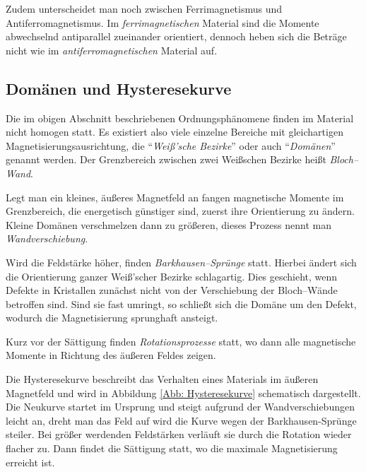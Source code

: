 \documentclass[12pt,a4paper]{scrartcl}
\numberwithin{equation}{section} %
\begin{document}
Zudem unterscheidet man noch zwischen Ferrimagnetismus und Antiferromagnetismus. Im \emph{ferrimagnetischen} Material sind die Momente abwechselnd antiparallel zueinander orientiert, dennoch heben sich die Beträge nicht wie im \emph{antiferromagnetischen} Material auf.

\hypertarget{domuxe4nen-und-hysteresekurve}{%
\subsection{Domänen und Hysteresekurve}\label{domuxe4nen-und-hysteresekurve}}
Die im obigen Abschnitt beschriebenen Ordnungsphänomene finden im Material nicht homogen statt. Es existiert also viele einzelne Bereiche mit gleichartigen Magnetisierungsausrichtung, die ``\emph{Weiß'sche Bezirke}'' oder auch ``\emph{Domänen}'' genannt werden. Der Grenzbereich zwischen zwei Weißschen Bezirke heißt \emph{Bloch--Wand}.

Legt man ein kleines, äußeres Magnetfeld an fangen magnetische Momente im Grenzbereich, die energetisch günstiger sind, zuerst ihre Orientierung zu ändern. Kleine Domänen verschmelzen dann zu größeren, dieses Prozess nennt man \emph{Wandverschiebung}.

Wird die Feldstärke höher, finden \emph{Barkhausen--Sprünge} statt. Hierbei ändert sich die Orientierung ganzer Weiß'scher Bezirke schlagartig. Dies geschieht, wenn Defekte in Kristallen zunächst nicht von der Verschiebung der Bloch--Wände betroffen sind. Sind sie fast umringt, so schließt sich die Domäne um den Defekt, wodurch die Magnetisierung sprunghaft ansteigt.

Kurz vor der Sättigung finden \emph{Rotationsprozesse} statt, wo dann alle magnetische Momente in Richtung des äußeren Feldes zeigen.

Die Hysteresekurve beschreibt das Verhalten eines Materials im äußeren Magnetfeld und wird in Abbildung \ref{Abb: Hysteresekurve} schematisch dargestellt. Die Neukurve startet im Ursprung und steigt aufgrund der Wandverschiebungen leicht an, dreht man das Feld auf wird die Kurve wegen der Barkhausen-Sprünge steiler. Bei größer werdenden Feldstärken verläuft sie durch die Rotation wieder flacher zu. Dann findet die Sättigung statt, wo die maximale Magnetisierung erreicht ist.
\end{document}
